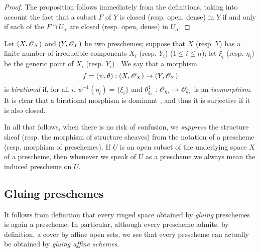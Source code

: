 \begin{proof}
\label{proof-1.2.2.8}
The proposition follows immediately from the definitions, taking into
account the fact that a subset $F$ of $Y$ is closed (resp. open, dense) in $Y$
if and only if each of the $F\cap U_\alpha$ are closed (resp. open, dense) in
$U_\alpha$.
\end{proof}

\begin{env}[2.2.9]
\label{1.2.2.9}
Let $(X,\mathscr{O}_X)$ and $(Y,\mathscr{O}_Y)$ be two preschemes; suppose that
$X$ (resp. $Y$) has a finite number of irreducible components $X_i$ (resp.
$Y_i$) ($1\leqslant i\leqslant n$); let $\xi_i$ (resp. $\eta_i$) be the generic
point of $X_i$ (resp. $Y_i$) . We say that a morphism
\[
  f=(\psi,\theta):(X,\mathscr{O}_X)\to(Y,\mathscr{O}_Y)
\]
is {\em birational} if, for all $i$, $\psi^{-1}(\eta_i)=\{\xi_i\}$ and
$\theta_{\xi_i}^\sharp:\mathscr{O}_{\eta_i}\to\mathscr{O}_{\xi_i}$ is an {\em isomorphism}. It
is clear that a birational morphism is dominant , and
thus it is surjective if it is also closed.
\end{env}

\begin{nota}[2.2.10]
\label{1.2.2.10}
In all that follows, when there is
no risk of confusion, we {\em suppress} the structure sheaf (resp. the morphism
of structure sheaves) from the notation of a prescheme (resp. morphism of
preschemes). If $U$ is an open subset of the underlying space $X$ of a
prescheme, then whenever we speak of $U$ as a prescheme we always mean the
induced prescheme on $U$.
\end{nota}

\subsection{Gluing preschemes}
\label{subsection-gluing-preschemes}

\begin{env}[2.3.1]
\label{1.2.3.1}
It follows from definition  that every ringed space obtained by
{\em gluing} preschemes  is again a prescheme. In particular, although
every prescheme admits, by definition, a cover by affine open sets, we see that every
prescheme can actually be obtained by {\em gluing affine schemes}.
\end{env}

